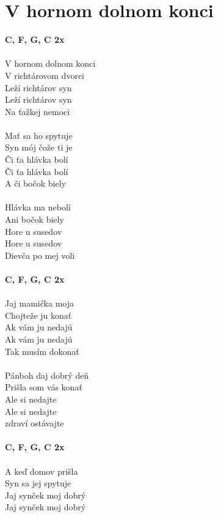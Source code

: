 \section{V hornom dolnom konci}
\footnotesize\textbf{C, F, G, C 2x}\\
\\
\normalsize
{}V hornom dolnom konci\\
V richtárovom dvorci\\
Leží richtárov syn\\
Leží richtárov syn\\
Na ťažkej nemoci\\
\\
Mať sa ho spytuje\\
Syn mój čože ti je\\
Či ťa hlávka bolí\\
Či ťa hlávka bolí\\
A či bočok biely\\
\\
Hlávka ma nebolí\\
Ani bočok biely\\
Hore u susedov\\
Hore u susedov\\
Dievča po mej voli\\
\\
\footnotesize\textbf{C, F, G, C 2x}\\
\\
\normalsize
Jaj mamička moja\\
Chojteže ju konať\\
Ak vám ju nedajú\\
Ak vám ju nedajú\\
Tak musím dokonať\\
\\
Pánboh daj dobrý deň\\
Prišla som vás konať\\
Ale si nedajte\\
Ale si nedajte\\
zdraví ostávajte\\
\\
\footnotesize\textbf{C, F, G, C 2x}\\
\\
\normalsize
A keď domov prišla\\
Syn sa jej spytuje\\
Jaj synček moj dobrý\\
Jaj synček moj dobrý\\
